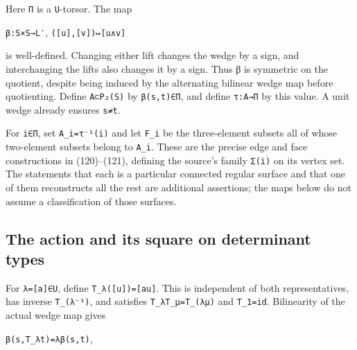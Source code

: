 \documentclass[
  10pt,
]{article}
\begin{document}
Here \texttt{\small Π} is a \texttt{\small U}-torsor. The map

\texttt{\small β:\allowbreak{}S×S→\allowbreak{}L′},
\texttt{\small (\allowbreak{}[\allowbreak{}u]\allowbreak{},\allowbreak{}[\allowbreak{}v]\allowbreak{})\allowbreak{}↦[\allowbreak{}u∧v]\allowbreak{}}

is well-defined. Changing either lift changes the wedge by a sign, and
interchanging the lifts also changes it by a sign. Thus β is symmetric
on the quotient, despite being induced by the alternating bilinear wedge
map before quotienting. Define
\texttt{\small A⊂P₂(\allowbreak{}S)\allowbreak{}} by
\texttt{\small β(\allowbreak{}s,\allowbreak{}t)\allowbreak{}∈Π}, and
define \texttt{\small τ:\allowbreak{}A→\allowbreak{}Π} by this value. A
unit wedge already ensures \texttt{\small s≠t}.

For \texttt{\small i∈Π}, set
\texttt{\small A\_\allowbreak{}i=\allowbreak{}τ⁻¹(\allowbreak{}i)\allowbreak{}}
and let \texttt{\small F\_\allowbreak{}i} be the three-element subsets
all of whose two-element subsets belong to
\texttt{\small A\_\allowbreak{}i}. These are the precise edge and face
constructions in (120)--(121), defining the source's family
\texttt{\small Σ(\allowbreak{}i)\allowbreak{}} on its vertex set. The
statements that each is a particular connected regular surface and that
one of them reconstructs all the rest are additional assertions; the
maps below do not assume a classification of those surfaces.

\subsection{The action and its square on determinant
types}\label{the-action-and-its-square-on-determinant-types}

For \texttt{\small λ=\allowbreak{}[\allowbreak{}a]\allowbreak{}∈U},
define
\texttt{\small T\_\allowbreak{}λ(\allowbreak{}[\allowbreak{}u]\allowbreak{})\allowbreak{}=\allowbreak{}[\allowbreak{}au]\allowbreak{}}.
This is independent of both representatives, has inverse
\texttt{\small T\_\allowbreak{}(\allowbreak{}λ⁻¹)\allowbreak{}}, and
satisfies
\texttt{\small T\_\allowbreak{}λT\_\allowbreak{}μ=\allowbreak{}T\_\allowbreak{}(\allowbreak{}λμ)\allowbreak{}}
and \texttt{\small T\_\allowbreak{}1=\allowbreak{}id}. Bilinearity of
the actual wedge map gives

\texttt{\small β(\allowbreak{}s,\allowbreak{}T\_\allowbreak{}λt)\allowbreak{}=\allowbreak{}λβ(\allowbreak{}s,\allowbreak{}t)\allowbreak{}},
\end{document}
